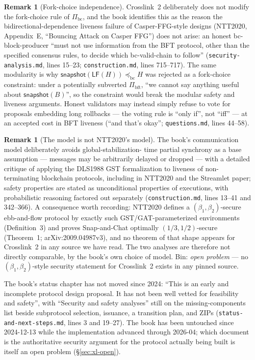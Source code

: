 \documentclass[11pt,a4paper]{article}
\theoremstyle{definition}
\newtheorem{remark}[theorem]{Remark}
\begin{document}
\begin{remark}[Fork-choice independence]\label{rem:xl-fork-choice}
Crosslink~2 deliberately does not modify the fork-choice rule of
$\Pi_{\mathrm{bc}}$, and the book identifies this as the reason the
bidirectional-dependence liveness failure of Casper-FFG-style designs
(NTT2020, Appendix~E, ``Bouncing Attack on Casper FFG'') does not arise:
an honest bc-block-producer ``must not use information from the BFT
protocol, other than the specified consensus rules, to decide which
bc-valid-chain to follow'' (\texttt{security-analysis.md}, lines 15--23;
\texttt{construction.md}, lines 715--717). The same modularity is why
$\mathsf{snapshot}(\mathsf{LF}(H)) \preceq_{\mathrm{bc}} H$ was rejected
as a fork-choice constraint: under a potentially subverted
$\Pi_{\mathrm{bft}}$, ``we cannot say anything useful about
$\mathsf{snapshot}(B)$'', so the constraint would break the modular
safety and liveness arguments. Honest validators may instead simply refuse
to vote for proposals embedding long rollbacks --- the voting rule is
``only if'', not ``iff'' --- at an accepted cost in BFT liveness (``and
that's okay''; \texttt{questions.md}, lines 44--58).
\end{remark}

\begin{remark}[The model is not NTT2020's model]\label{rem:xl-model}
The book's communication model deliberately avoids global-stabilization-%
time partial synchrony as a base assumption --- messages may be arbitrarily
delayed or dropped --- with a detailed critique of applying the DLS1988
GST formalization to liveness of non-terminating blockchain protocols,
including in NTT2020 and the Streamlet paper; safety properties are stated
as unconditional properties of executions, with probabilistic reasoning
factored out separately (\texttt{construction.md}, lines 13--41 and
342--366). A consequence worth recording: NTT2020 defines a
$(\beta_1, \beta_2)$-secure ebb-and-flow protocol by exactly such
GST/GAT-parameterized environments (Definition~3) and proves Snap-and-Chat
optimally $(1/3, 1/2)$-secure (Theorem~1; arXiv:2009.04987v3), and no
theorem of that shape appears for Crosslink~2 in any source we have read.
The two analyses are therefore not directly comparable, by the book's own
choice of model. Bin: \emph{open problem} --- no
$(\beta_1, \beta_2)$-style security statement for Crosslink~2 exists in
any pinned source.
\end{remark}

The book's status chapter has not moved since 2024: ``This is an early and
incomplete protocol design proposal. It has not been well vetted for
feasibility and safety'', with ``Security and safety analyses'' still on
the missing-components list beside subprotocol selection, issuance, a
transition plan, and ZIPs (\texttt{status-and-next-steps.md}, lines 3 and
19--27). The book has been untouched since 2024-12-13 while the
implementation advanced through 2026-04; which document is the
authoritative security argument for the protocol actually being built is
itself an open problem (\S\ref{sec:xl-open}).
\end{document}
